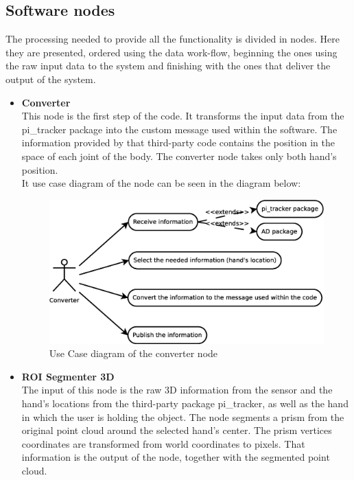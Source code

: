 \subsection*{Software nodes}

The processing needed to provide all the functionality is divided in nodes. Here they are presented, ordered using the data work-flow, beginning the ones using the raw input data to the system and finishing with the ones that deliver the output of the system. 
\\

\begin{itemize}
	\item{\textbf{\large Converter}}\\
This node is the first step of the code. It transforms the input data from the pi\_tracker package into the custom message used within the software. The information provided by that third-party code contains the position in the space of each joint of the body. The converter node takes only both hand's position. 
\\

It use case diagram of the node can be seen in the diagram below: 

\begin{figure}[h]
	\begin{center}
\includegraphics[scale=0.2]{img/diagrams/uc_converter.eps}
	\caption[Use case diagram converter node]{Use Case diagram of the converter node}
	\end{center}
\end{figure}

	
	\item{\textbf{ROI Segmenter 3D}}\\
The input of this node is the raw 3D information from the sensor and the hand's locations from the third-party package pi\_tracker, as well as the hand in which the user is holding the object. The node segments a prism from the original point cloud around the selected hand's center. The prism vertices coordinates are transformed from world coordinates to pixels. That information is the output of the node, together with the segmented point cloud. 


\end{itemize}
